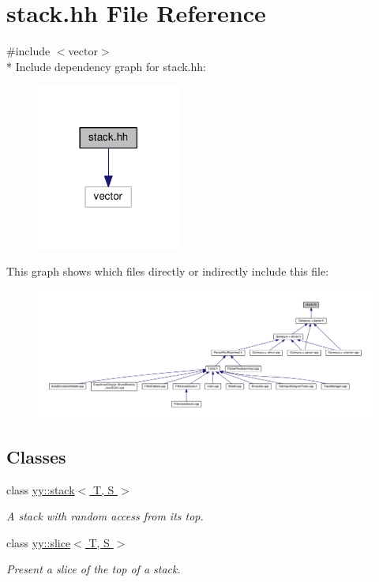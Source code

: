 \hypertarget{stack_8hh}{\section{stack.\-hh File Reference}
\label{stack_8hh}
}
{\ttfamily \#include $<$vector$>$}\\*
Include dependency graph for stack.\-hh\-:\nopagebreak
\begin{figure}[H]
\begin{center}
\leavevmode
\includegraphics[width=134pt]{stack_8hh__incl}
\end{center}
\end{figure}
This graph shows which files directly or indirectly include this file\-:
\nopagebreak
\begin{figure}[H]
\begin{center}
\leavevmode
\includegraphics[width=350pt]{stack_8hh__dep__incl}
\end{center}
\end{figure}
\subsection*{Classes}
\begin{DoxyCompactItemize}
\item 
class \hyperlink{classyy_1_1stack}{yy\-::stack$<$ T, S $>$}
\begin{DoxyCompactList}\small\item\em A stack with random access from its top. \end{DoxyCompactList}\item 
class \hyperlink{classyy_1_1slice}{yy\-::slice$<$ T, S $>$}
\begin{DoxyCompactList}\small\item\em Present a slice of the top of a stack. \end{DoxyCompactList}\end{DoxyCompactItemize}
